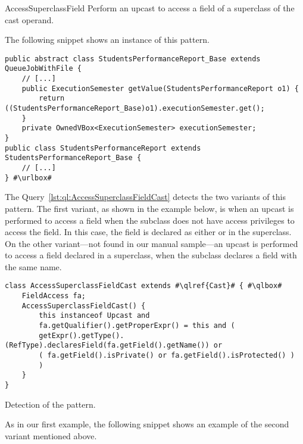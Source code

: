 \begin{pattern}{AccessSuperclassField}
Perform an upcast to access a field of a superclass of the cast operand.

\instances{}
The following snippet shows an instance of this pattern.

\def\urlvar{http://bit.ly/FenixEdu_fenixedu_academic_2SQxlkC}
\begin{verbatim}
public abstract class StudentsPerformanceReport_Base extends QueueJobWithFile {
    // [...]
    public ExecutionSemester getValue(StudentsPerformanceReport o1) {
        return ((StudentsPerformanceReport_Base)o1).executionSemester.get();
    }
    private OwnedVBox<ExecutionSemester> executionSemester;
}
public class StudentsPerformanceReport extends StudentsPerformanceReport_Base {
    // [...]
} #\urlbox#
\end{verbatim}


\detection{}
The Query~\ref{lst:ql:AccessSuperclassFieldCast} detects the two variants of this pattern.
The first variant, as shown in the example below, is when an upcast is performed to access a field when the subclass does not have access privileges to access the field.
In this case, the field is declared as either  or  in the superclass.
On the other variant---not found in our manual sample---an upcast is performed to access a field declared in a superclass,
when the subclass declares a field with the same name.

\begin{listing}
\begin{verbatim}
class AccessSuperclassFieldCast extends #\qlref{Cast}# { #\qlbox#
	FieldAccess fa;
	AccessSuperclassFieldCast() {
		this instanceof Upcast and
		fa.getQualifier().getProperExpr() = this and (
		getExpr().getType().(RefType).declaresField(fa.getField().getName()) or
		( fa.getField().isPrivate() or fa.getField().isProtected() )
		)
	}
}
\end{verbatim}
\caption{Detection of the \thisp{} pattern.}
\label{lst:ql:AccessSuperclassFieldCast}
\end{listing}

As in our first example,
the following snippet shows an example of the second variant mentioned above.


\end{pattern}
